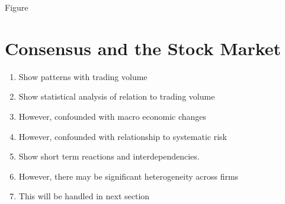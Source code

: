 Figure 





\section{Consensus and the Stock Market}
\begin{enumerate}
  \item Show patterns with trading volume
  \item Show statistical analysis of relation to trading volume
  \item However, confounded with macro economic changes
  \item However, confounded with relationship to systematic risk
  \item Show short term reactions and interdependencies.
  \item However, there may be significant heterogeneity across firms
  \item This will be handled in next section
 \end{enumerate}


